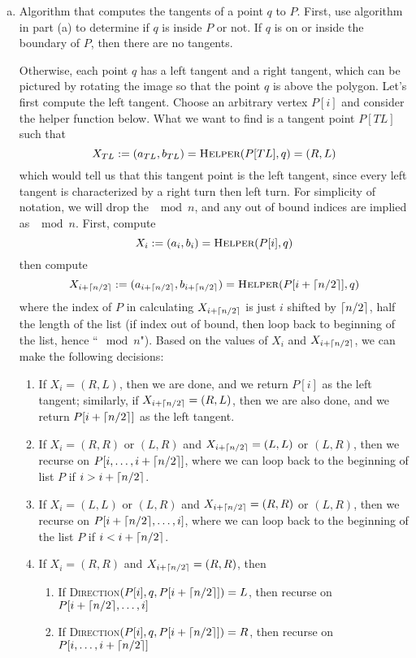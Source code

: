 \documentclass{article}
\DeclarePairedDelimiter\ceil{\lceil}{\rceil}
\begin{document}
\begin{enumerate}[(a)]
\begin{proof}[Proof of runtime]
The base case when $|P|=3$ runs in constant time. For all other cases, we can write the following recurrence relation:
$$ T(n) = T(n/2) + O(1)$$
since each time we compute the line $y$ takes only constant time, and we reduce the problem by half depending on whether $q$ lies above $y$ or not. By Master Theorem, $T(n)=\Theta(\log n)$. Thus, the algorithm runs in $O(\log n)$ time.
\end{proof}

\item Algorithm that computes the tangents of a point $q$ to $P$. First, use algorithm in part (a) to determine if $q$ is inside $P$ or not. If $q$ is on or inside the boundary of $P$, then there are no tangents.

Otherwise, each point $q$ has a left tangent and a right tangent, which can be pictured by rotating the image so that the point $q$ is above the polygon. Let's first compute the left tangent. Choose an arbitrary vertex $P[i]$ and consider the helper function below. What we want to find is a tangent point $P[TL]$ such that $$X_{TL}:=(a_{TL},b_{TL}) = \textsc{Helper}(P[TL],q) = (R,L)$$
which would tell us that this tangent point is the left tangent, since every left tangent is characterized by a right turn then left turn. For simplicity of notation, we will drop the $\mod n$, and any out of bound indices are implied as $\mod n$. First, compute $$X_i:=(a_i, b_i)=\textsc{Helper}(P[i], q)$$
then compute $$X_{i+\ceil{n/2}}:=(a_{i+\ceil{n/2}}, b_{i+\ceil{n/2}})=\textsc{Helper}(P[i+\ceil{n/2}], q)$$
where the index of $P$ in calculating $X_{i+\ceil{n/2}}$ is just $i$ shifted by $\ceil{n/2}$, half the length of the list (if index out of bound, then loop back to beginning of the list, hence ``$\mod n$"). Based on the values of $X_i$ and $X_{i+\ceil{n/2}}$, we can make the following decisions:
\begin{enumerate}
\item If $X_i =(R,L)$, then we are done, and we return $P[i]$ as the left tangent; similarly, if $X_{i+\ceil{n/2}}=(R,L)$, then we are also done, and we return $P[i+\ceil{n/2}]$ as the left tangent.
\item If $X_i=(R,R)$ or $(L,R)$ and $X_{i+\ceil{n/2}}=(L,L)$ or $(L,R)$, then we recurse on $P[i, \dots, i+\ceil{n/2}]$, where we can loop back to the beginning of list $P$ if $i>i+\ceil{n/2}$.
\item If $X_i=(L,L)$ or $(L,R)$ and $X_{i+\ceil{n/2}}=(R,R)$ or $(L,R)$, then we recurse on $P[i+\ceil{n/2}, \dots, i]$, where we can loop back to the beginning of the list $P$ if $i<i+\ceil{n/2}$. 
\item If $X_i=(R,R)$ and $X_{i+\ceil{n/2}}=(R,R)$, then 
	\begin{enumerate}
	\item If \textsc{Direction}$(P[i],q,P[i+\ceil{n/2}]) = L$, then recurse on $P[i+\ceil{n/2},\dots,i]$
	\item If \textsc{Direction}$(P[i],q,P[i+\ceil{n/2}]) = R$, then recurse on $P[i, \dots, i+\ceil{n/2}]$
	\end{enumerate}


\end{enumerate}
\end{enumerate}
\end{document}
